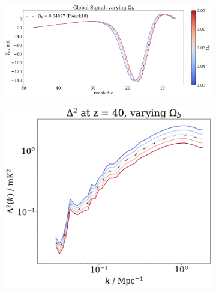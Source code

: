 \documentclass[floats,floatfix,showpacs,amssymb,prd,superscriptaddress,nofootinbib]{revtex4-2} %
\begin{document}
\begin{figure}[H]
     \centering
     \begin{subfigure}[b]{0.9\textwidth}
         \centering
         \includegraphics[width=\textwidth]{images/simulation_results/global_signal_Ob.png}
         \label{fig:global_signal_Ob}
     \end{subfigure}
     \hfill
     \begin{subfigure}[b]{0.45\textwidth}
         \centering
         \includegraphics[width=\textwidth]{images/simulation_results/power_spectrum_fixed_z_40_Ob.png}
         \label{fig:power_spectrum_fixed_z_40_Ob}
     \end{subfigure}
     \hfill
     \begin{subfigure}[b]{0.45\textwidth}
         \centering

\end{subfigure}
\end{figure}
\end{document}
